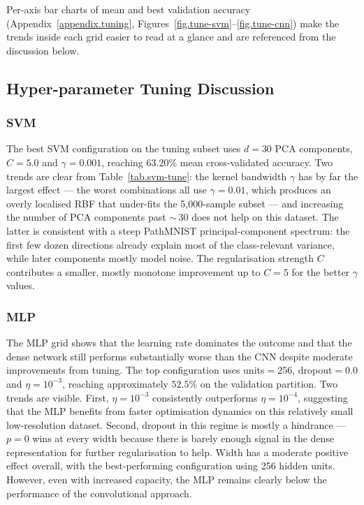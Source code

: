 \documentclass[../main.tex]{subfiles}
\begin{document}
\noindent
Per-axis bar charts of mean and best validation accuracy
(Appendix~\ref{appendix.tuning}, Figures~\ref{fig.tune-svm}--\ref{fig.tune-cnn})
make the trends inside each grid easier to read at a glance and are
referenced from the discussion below.

\subsection{Hyper-parameter Tuning Discussion}

\subsubsection{SVM}
\noindent
The best SVM configuration on the tuning subset uses
$d{=}30$ \gls{PCA} components,
$C{=}5.0$ and
$\gamma{=}0.001$, reaching
$63.20\%$ mean cross-validated accuracy.
Two trends are clear from Table~\ref{tab.svm-tune}: the kernel bandwidth
$\gamma$ has by far the largest effect — the worst combinations all use
$\gamma{=}0.01$, which produces an overly localised RBF that
under-fits the 5{,}000-sample subset — and increasing the number of
\gls{PCA} components past $\sim$\,30 does not help on this dataset. The
latter is consistent with a steep PathMNIST principal-component spectrum:
the first few dozen directions already explain most of the
class-relevant variance, while later components mostly model noise. The
regularisation strength $C$ contributes a smaller, mostly monotone
improvement up to $C{=}5$ for the better $\gamma$ values.

\subsubsection{MLP}
\noindent
The MLP grid shows that the learning rate dominates the outcome and that
the dense network still performs substantially worse than the CNN despite
moderate improvements from tuning. The top configuration uses
units${=}256$,
dropout${=}0.0$ and
$\eta{=}10^{-3}$,
reaching approximately
$52.5\%$ on the validation partition. Two trends are visible. First, $\eta{=}10^{-3}$ consistently outperforms $\eta{=}10^{-4}$,
suggesting that the MLP benefits from faster optimisation dynamics on
this relatively small low-resolution dataset.
Second, dropout in this regime is mostly a hindrance — $p{=}0$ wins at
every width because there is barely enough signal in the dense
representation for further regularisation to help. Width has a moderate positive effect overall, with the best-performing
configuration using 256 hidden units. However, even with increased capacity, the MLP remains clearly below the
performance of the convolutional approach.
\end{document}
